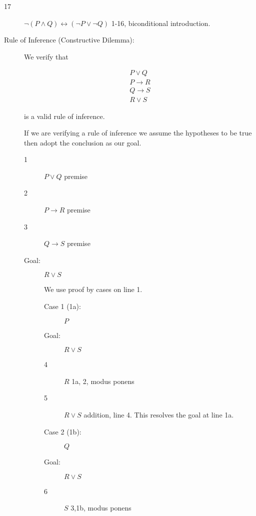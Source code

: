 \documentclass[12pt]{book}
\begin{document}
\begin{description}
\begin{description}
\end{description}

\item[17]  $\neg(P \wedge Q) \leftrightarrow (\neg P \vee \neg Q)$ 1-16, biconditional introduction.

\newpage


\item[Rule of Inference (Constructive Dilemma):]

We verify that

$$\begin{array}{r} P \vee Q \\ P \rightarrow R \\ Q \rightarrow S \\ \hline R \vee S \end{array}$$

is a valid rule of inference.

If we are verifying a rule of inference we assume the hypotheses to be true then adopt the  conclusion as our goal.

\begin{description}

\item[1]  $P \vee Q$  premise

\item[2] $P \rightarrow R$  premise

\item[3] $Q \rightarrow S$  premise

\item[Goal:]  $R \vee S$

We use proof by cases on line 1.

\begin{description}

\item[Case 1 (1a):]  $P$

\item[Goal:]  $R \vee S$

\item[4] $R$  1a, 2, modus ponens

\item[5]  $R \vee S$  addition, line 4.  This resolves the goal at line 1a.



\item[Case 2 (1b):]  $Q$

\item[Goal:]  $R \vee S$

\item[6]  $S$  3,1b, modus ponens


\end{description}
\end{description}
\end{description}
\end{document}
